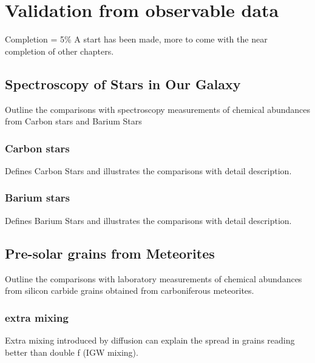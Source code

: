 \chapter{Validation from observable data}

Completion = 5\%
A start has been made, more to come with the near completion of other chapters.

\section{Spectroscopy of Stars in Our Galaxy}

Outline the comparisons with spectroscopy measurements of chemical abundances from Carbon stars and Barium Stars

\subsection{Carbon stars}

Defines Carbon Stars and illustrates the comparisons with detail description.

\subsection{Barium stars}

Defines Barium Stars and illustrates the comparisons with detail description.

\section{Pre-solar grains from Meteorites}

Outline the comparisons with laboratory measurements of chemical abundances from silicon carbide grains obtained from carboniferous meteorites.

\subsection{extra mixing}

Extra mixing introduced by diffusion can explain the spread in grains reading better than double f (IGW mixing).
